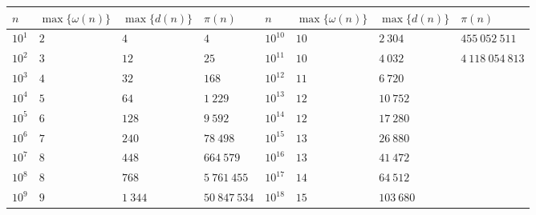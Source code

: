 \begin{tabular}{llll|llll}
    \hline
    \(n\)    & \(\max\{\omega(n)\}\) & \(\max\{d(n)\}\) & \(\pi(n)\)     & \(n\)       & \(\max\{\omega(n)\}\) & \(\max\{d(n)\}\)  & \(\pi(n)\)        \\
    \hline
    \(10^1\) & \(2\)                 & \(4\)            & \(4\)          & \(10^{10}\) & \(10\)                & \(2~304\)         & \(455~052~511\)   \\
    \(10^2\) & \(3\)                 & \(12\)           & \(25\)         & \(10^{11}\) & \(10\)                & \(4~032\)         & \(4~118~054~813\) \\
    \(10^3\) & \(4\)                 & \(32\)           & \(168\)        & \(10^{12}\) & \(11\)                & \(6~720\)         &                   \\
    \(10^4\) & \(5\)                 & \(64\)           & \(1~229\)      & \(10^{13}\) & \(12\)                & \(10~752\)        &                   \\
    \(10^5\) & \(6\)                 & \(128\)          & \(9~592\)      & \(10^{14}\) & \(12\)                & \(17~280\)        &                   \\
    \(10^6\) & \(7\)                 & \(240\)          & \(78~498\)     & \(10^{15}\) & \(13\)                & \(26~880\)        &                   \\
    \(10^7\) & \(8\)                 & \(448\)          & \(664~579\)    & \(10^{16}\) & \(13\)                & \(41~472\)        &                   \\
    \(10^8\) & \(8\)                 & \(768\)          & \(5~761~455\)  & \(10^{17}\) & \(14\)                & \(64~512\)        &                   \\
    \(10^9\) & \(9\)                 & \(1~344\)        & \(50~847~534\) & \(10^{18}\) & \(15\)                & \(103~680\)       &                   \\
    \hline
\end{tabular}
